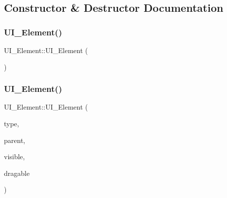 \subsection{Constructor \& Destructor Documentation}
\mbox{\label{class_u_i___element_a4b337671cff586ef9c8bcbcd06a08356}} 
\subsubsection{\texorpdfstring{UI\_Element()}{UI\_Element()}\hspace{0.1cm}{\footnotesize\ttfamily [1/2]}}
{\footnotesize\ttfamily U\+I\+\_\+\+Element\+::\+U\+I\+\_\+\+Element (\begin{DoxyParamCaption}{ }\end{DoxyParamCaption})\hspace{0.3cm}{\ttfamily [inline]}}

\mbox{\label{class_u_i___element_ad7184033dd8aff731f4a4f555bded9c8}} 
\subsubsection{\texorpdfstring{UI\_Element()}{UI\_Element()}\hspace{0.1cm}{\footnotesize\ttfamily [2/2]}}
{\footnotesize\ttfamily U\+I\+\_\+\+Element\+::\+U\+I\+\_\+\+Element (\begin{DoxyParamCaption}\item[{\mbox{\hyperlink{class_u_i___element_a7ed595c46c75d53d30fa3813b036cf1e}{U\+I\+\_\+type}}}]{type,  }\item[{\mbox{\hyperlink{class_u_i___element}{U\+I\+\_\+\+Element}} $\ast$}]{parent,  }\item[{bool}]{visible,  }\item[{\mbox{\hyperlink{struct_dragable}{Dragable}}}]{dragable }\end{DoxyParamCaption})\hspace{0.3cm}{\ttfamily [inline]}}

\mbox{\label{class_u_i___element_aad1976da74baf5d57087f27ad43d1401}} 
